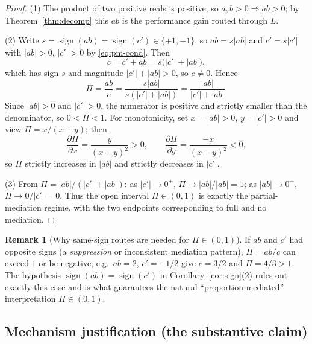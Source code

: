 \documentclass{amsart}
\theoremstyle{definition}
\newtheorem{remark}{Remark}
\begin{document}
\begin{proof}
(1) The product of two positive reals is positive, so $a,b>0\Rightarrow ab>0$;
by Theorem~\ref{thm:decomp} this $ab$ is the performance gain routed through
$L$.

(2) Write $s=\operatorname{sign}(ab)=\operatorname{sign}(c')\in\{+1,-1\}$, so
$ab=s|ab|$ and $c'=s|c'|$ with $|ab|>0$, $|c'|>0$ by \eqref{eq:pm-cond}. Then
\[
c=c'+ab=s\bigl(|c'|+|ab|\bigr),
\]
which has sign $s$ and magnitude $|c'|+|ab|>0$, so $c\neq0$. Hence
\[
\Pi=\frac{ab}{c}=\frac{s|ab|}{s(|c'|+|ab|)}=\frac{|ab|}{|c'|+|ab|}.
\]
Since $|ab|>0$ and $|c'|>0$, the numerator is positive and strictly smaller
than the denominator, so $0<\Pi<1$. For monotonicity, set $x=|ab|>0$,
$y=|c'|>0$ and view $\Pi=x/(x+y)$; then
\[
\frac{\partial\Pi}{\partial x}=\frac{y}{(x+y)^2}>0,\qquad
\frac{\partial\Pi}{\partial y}=\frac{-x}{(x+y)^2}<0,
\]
so $\Pi$ strictly increases in $|ab|$ and strictly decreases in $|c'|$.

(3) From $\Pi=|ab|/(|c'|+|ab|)$: as $|c'|\to0^+$, $\Pi\to|ab|/|ab|=1$; as
$|ab|\to0^+$, $\Pi\to0/|c'|=0$. Thus the open interval $\Pi\in(0,1)$ is exactly
the partial-mediation regime, with the two endpoints corresponding to full and
no mediation.
\end{proof}

\begin{remark}[Why same-sign routes are needed for $\Pi\in(0,1)$]
If $ab$ and $c'$ had opposite signs (a \emph{suppression} or inconsistent
mediation pattern), $\Pi=ab/c$ can exceed $1$ or be negative; e.g.\ $ab=2$,
$c'=-1/2$ give $c=3/2$ and $\Pi=4/3>1$. The hypothesis
$\operatorname{sign}(ab)=\operatorname{sign}(c')$ in
Corollary~\ref{cor:sign}(2) rules out exactly this case and is what guarantees
the natural ``proportion mediated'' interpretation $\Pi\in(0,1)$.
\end{remark}

\subsection{Mechanism justification (the substantive claim)}
\end{document}
